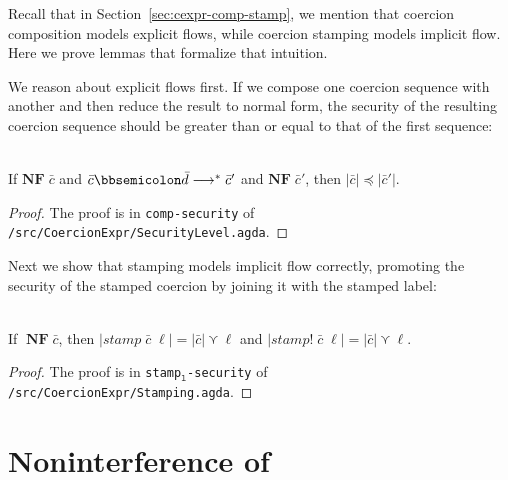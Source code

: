 Recall that in Section~\ref{sec:cexpr-comp-stamp}, we mention that coercion
composition models explicit flows, while coercion stamping models implicit flow.
Here we prove lemmas that formalize that intuition.

We reason about explicit flows first. If we compose one coercion
sequence with another and then reduce the result to normal form, the
security of the resulting coercion sequence should be greater than or
equal to that of the first sequence:

\begin{lemma}\ \\
  \label{lem:comp-explicit}
  If $\mathbf{NF} \; \bar{c}$
  and $\bar{c} \mdoubleplus \bar{d} \longrightarrow^{*} \bar{c}'$
  and $\mathbf{NF} \; \bar{c}'$,
  then $|\bar{c}| \preccurlyeq |\bar{c}'|$.
\end{lemma}
\begin{proof}
  The proof is in \texttt{comp-security} of \texttt{/src/CoercionExpr/SecurityLevel.agda}.
\end{proof}

Next we show that stamping models implicit flow correctly, promoting
the security of the stamped coercion by joining it with the stamped
label:

\begin{lemma}\ \\
  \label{lem:stamp-implicit}
  If $\;\mathbf{NF}\; \bar{c}$,
  then $| \mathit{stamp} \; \bar{c} \; \ell| = |\bar{c}| \curlyvee \ell$
  and $| \mathit{stamp!} \; \bar{c} \; \ell| = |\bar{c}| \curlyvee \ell$.
\end{lemma}
\begin{proof}
  The proof is in \texttt{stamp$_{\mathtt{l}}$-security} of \texttt{/src/CoercionExpr/Stamping.agda}.
\end{proof}

\section{Noninterference of \DynIFC}
\label{sec:NI-dynifc}

